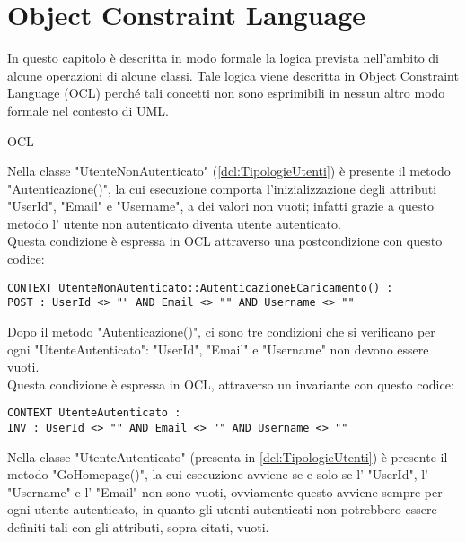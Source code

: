 \section{Object Constraint Language}
\label{secD3:ObjectConstraintLanguage}

In questo capitolo è descritta in modo formale la logica prevista nell'ambito di alcune operazioni di alcune classi. Tale logica viene descritta in Object Constraint Language (OCL) perché tali concetti non sono esprimibili in nessun altro modo formale nel contesto di UML.


\begin{listaPersonale}{OCL}
    \begin{center}
        
    \end{center}
    Nella classe "UtenteNonAutenticato" (\ref{dcl:TipologieUtenti}) è presente il metodo "Autenticazione()", la cui esecuzione comporta l'inizializzazione degli attributi "UserId", "Email" e "Username", a dei valori non vuoti; infatti grazie a questo metodo l' utente non autenticato diventa utente autenticato. \\
    Questa condizione è espressa in OCL attraverso una postcondizione con questo codice:
    \begin{lstlisting}
CONTEXT UtenteNonAutenticato::AutenticazioneECaricamento() : 
POST : UserId <> "" AND Email <> "" AND Username <> ""
    \end{lstlisting}
    Dopo il metodo "Autenticazione()", ci sono tre condizioni che si verificano per ogni "UtenteAutenticato": "UserId", "Email" e "Username" non devono essere vuoti. \\ Questa condizione è espressa in OCL, attraverso un invariante con questo codice:
    \begin{lstlisting}
CONTEXT UtenteAutenticato : 
INV : UserId <> "" AND Email <> "" AND Username <> ""
    \end{lstlisting}
    Nella classe "UtenteAutenticato" (presenta in \ref{dcl:TipologieUtenti}) è presente il metodo "GoHomepage()", la cui esecuzione avviene se e solo se l' "UserId", l' "Username" e l' "Email" non sono vuoti, ovviamente questo avviene sempre per ogni utente autenticato, in quanto gli utenti autenticati non potrebbero essere definiti tali con gli attributi, sopra citati, vuoti. \\

\end{listaPersonale}
